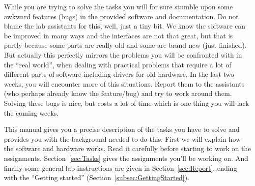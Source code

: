 \documentclass[10pt]{scrartcl}
\begin{document}
While you are trying to solve the tasks you will for sure stumble upon
some awkward features (bugs) in the provided software and documentation.
Do not blame the lab assistants for this, well, just a tiny bit. We know
the software can be improved in many ways and the interfaces are not
that great, but that is partly because some parts are really old and 
some are brand new (just finished).
But actually this perfectly mirrors the problems you will be confronted
with in the ``real world'', when dealing with practical problems that
require a lot of different parts of software including drivers for old
hardware. In the last two weeks, you will encounter more of this situations.
Report them to the assistants (who perhaps already know the
feature/bug) and try to work around them. Solving these bugs is nice, but
costs a lot of time which is one thing you will lack the coming weeks.

This manual gives you a precise description of the tasks you have to
solve and provides you with the background needed to do this. First we
will explain how the software and hardware works. Read it carefully
before starting to work on the assignments.  Section~\ref{sec:Tasks}
gives the assignments you'll be working on. And finally some  general lab
instructions are given in Section~\ref{sec:Report}, ending with the ``Getting started''
(Section~\ref{subsec:GettingStarted}).

\end{document}
